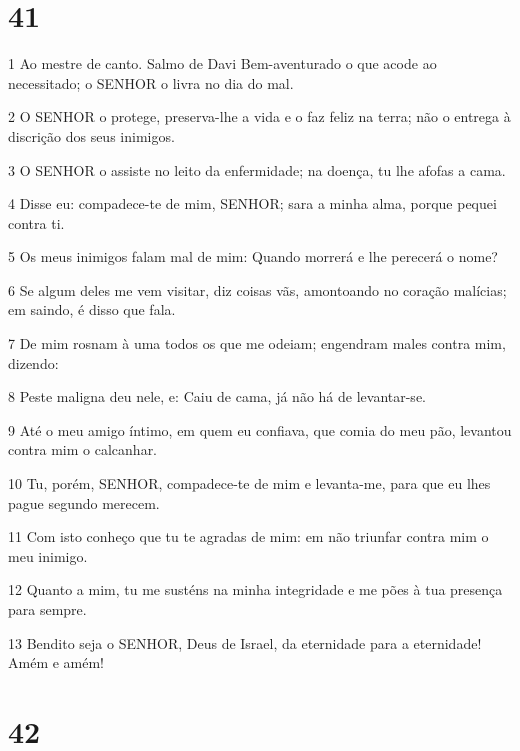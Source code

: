 \chapter{41}

\par 1 Ao mestre de canto. Salmo de Davi Bem-aventurado o que acode ao necessitado; o SENHOR o livra no dia do mal.
\par 2 O SENHOR o protege, preserva-lhe a vida e o faz feliz na terra; não o entrega à discrição dos seus inimigos.
\par 3 O SENHOR o assiste no leito da enfermidade; na doença, tu lhe afofas a cama.
\par 4 Disse eu: compadece-te de mim, SENHOR; sara a minha alma, porque pequei contra ti.
\par 5 Os meus inimigos falam mal de mim: Quando morrerá e lhe perecerá o nome?
\par 6 Se algum deles me vem visitar, diz coisas vãs, amontoando no coração malícias; em saindo, é disso que fala.
\par 7 De mim rosnam à uma todos os que me odeiam; engendram males contra mim, dizendo:
\par 8 Peste maligna deu nele, e: Caiu de cama, já não há de levantar-se.
\par 9 Até o meu amigo íntimo, em quem eu confiava, que comia do meu pão, levantou contra mim o calcanhar.
\par 10 Tu, porém, SENHOR, compadece-te de mim e levanta-me, para que eu lhes pague segundo merecem.
\par 11 Com isto conheço que tu te agradas de mim: em não triunfar contra mim o meu inimigo.
\par 12 Quanto a mim, tu me susténs na minha integridade e me pões à tua presença para sempre.
\par 13 Bendito seja o SENHOR, Deus de Israel, da eternidade para a eternidade! Amém e amém!

\chapter{42}

